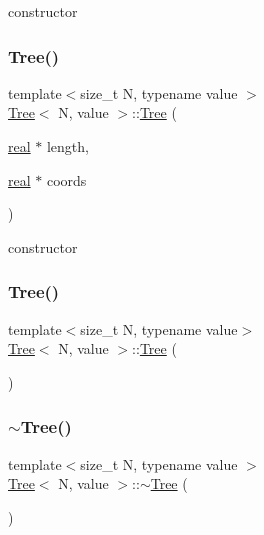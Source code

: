 constructor \mbox{\label{classTree_a6a43d80aaf3b7949cc412683161ef099}} 
\subsubsection{\texorpdfstring{Tree()}{Tree()}\hspace{0.1cm}{\footnotesize\ttfamily [2/3]}}
{\footnotesize\ttfamily template$<$size\+\_\+t N, typename value $>$ \\
\mbox{\hyperlink{classTree}{Tree}}$<$ N, value $>$\+::\mbox{\hyperlink{classTree}{Tree}} (\begin{DoxyParamCaption}\item[{\mbox{\hyperlink{definitions_8h_aedc0ad84d1e764530814f57ad931d02a}{real}} $\ast$}]{length,  }\item[{\mbox{\hyperlink{definitions_8h_aedc0ad84d1e764530814f57ad931d02a}{real}} $\ast$}]{coords }\end{DoxyParamCaption})}

constructor \mbox{\label{classTree_a1435fce46bded38e5de4b1d5a1e1aca2}} 
\subsubsection{\texorpdfstring{Tree()}{Tree()}\hspace{0.1cm}{\footnotesize\ttfamily [3/3]}}
{\footnotesize\ttfamily template$<$size\+\_\+t N, typename value$>$ \\
\mbox{\hyperlink{classTree}{Tree}}$<$ N, value $>$\+::\mbox{\hyperlink{classTree}{Tree}} (\begin{DoxyParamCaption}{ }\end{DoxyParamCaption})\hspace{0.3cm}{\ttfamily [inline]}}

\mbox{\label{classTree_afcec6e88f6434550c3abf3185a25ff53}} 
\subsubsection{\texorpdfstring{$\sim$\+Tree()}{~Tree()}}
{\footnotesize\ttfamily template$<$size\+\_\+t N, typename value $>$ \\
\mbox{\hyperlink{classTree}{Tree}}$<$ N, value $>$\+::$\sim$\mbox{\hyperlink{classTree}{Tree}} (\begin{DoxyParamCaption}{ }\end{DoxyParamCaption})}

